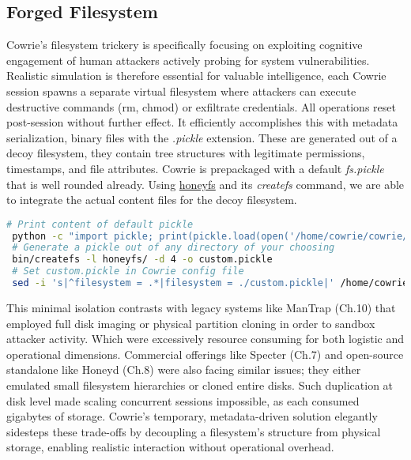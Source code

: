 \documentclass{cls/ULBreport}
\begin{document}
    \subsection{Forged Filesystem}
Cowrie's filesystem trickery is specifically focusing on exploiting cognitive engagement of human attackers actively probing for system vulnerabilities. Realistic simulation is therefore essential for valuable intelligence, each Cowrie session spawns a separate virtual filesystem where attackers can execute destructive commands (rm, chmod) or exfiltrate credentials. All operations reset post-session without further effect. It efficiently accomplishes this with metadata serialization, binary files with the \textit{.pickle} extension. These are generated out of a decoy filesystem, they contain tree structures with legitimate permissions, timestamps, and file attributes. Cowrie is prepackaged with a default \textit{fs.pickle} that is well rounded already. Using \href{https://github.com/cowrie/cowrie/blob/main/docs/HONEYFS.rst}{honeyfs} and its \textit{createfs} command, we are able to integrate the actual content files for the decoy filesystem.
 \begin{lstlisting}[language=bash,caption={Deceptive Filesystem Manipulation}]
 # Print content of default pickle 
 python -c "import pickle; print(pickle.load(open('/home/cowrie/cowrie/data/fs.pickle','rb')))" 
 # Generate a pickle out of any directory of your choosing
 bin/createfs -l honeyfs/ -d 4 -o custom.pickle  
 # Set custom.pickle in Cowrie config file 
 sed -i 's|^filesystem = .*|filesystem = ./custom.pickle|' /home/cowrie/cowrie/etc/cowrie.cfg
    \end{lstlisting}

This minimal isolation contrasts with legacy systems like ManTrap (Ch.10) that employed full disk imaging or physical partition cloning in order to sandbox attacker activity. Which were excessively resource consuming for both logistic and operational dimensions. Commercial offerings like Specter (Ch.7) and open-source standalone like Honeyd (Ch.8) were also facing similar issues; they either emulated small filesystem hierarchies or cloned entire disks. Such duplication at disk level made scaling concurrent sessions impossible, as each consumed gigabytes of storage. Cowrie's temporary, metadata-driven solution elegantly sidesteps these trade-offs by decoupling a filesystem's structure from physical storage, enabling realistic interaction without operational overhead.
\end{document}
